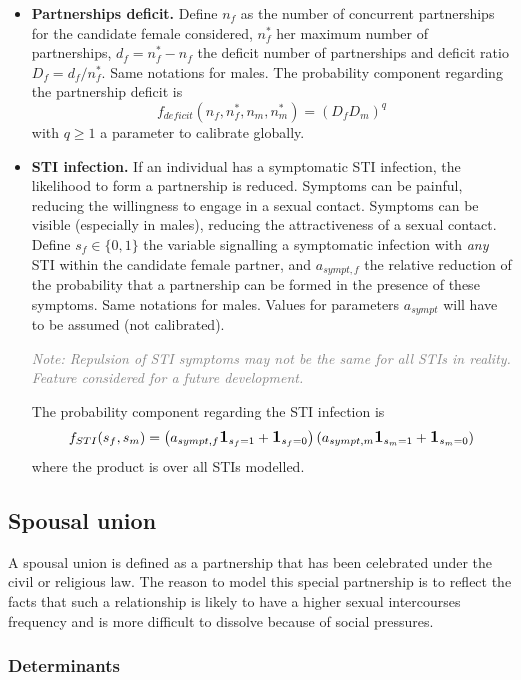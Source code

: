 \documentclass[11pt, onecolumn]{article}
\newcommand{\one}[1]{\textbf{\large{1}}_{#1}}
\newcommand{\note}[1]{\textit{\textcolor{Grey}{Note: #1}}}
\begin{document}
\begin{itemize}
\item \textbf{Partnerships deficit.} Define $n_f$ as the number of concurrent partnerships for the candidate female considered, $n^*_f$ her maximum number of partnerships, $d_f=n^*_f-n_f$ the deficit number of partnerships and deficit ratio $D_f=d_f/n^*_f$. Same notations for males. The probability component regarding the partnership deficit is
$$ f_{deficit}(n_f,n^*_f,n_m,n^*_m) = (D_f D_m)^q$$
with $q\geq 1$ a parameter to calibrate globally.

\item \textbf{STI infection.} If an individual has a symptomatic STI infection, the likelihood to form a partnership is reduced. Symptoms can be painful, reducing the willingness to engage in a sexual contact. Symptoms can be visible (especially in males), reducing the attractiveness of a sexual contact. Define $s_f\in\{0,1\}$ the variable signalling a symptomatic infection with \emph{any} STI within the candidate female partner, and $a_{sympt,f}$ the relative reduction of the probability that a partnership can be formed in the presence of these symptoms. Same notations for males. Values for parameters $a_{sympt}$ will have to be assumed (not calibrated). 

\note{Repulsion of STI symptoms may not be the same for all STIs in reality. Feature considered for a future development.}

The probability component regarding the STI infection is
$$ f_{STI}(s_f,s_m)= \left(a_{sympt,f} \one{s_f=1} +\one{s_f=0}\right) \left(a_{sympt,m} \one{s_m=1} +\one{s_m=0}\right)$$
where the product is over all STIs modelled.

\end{itemize}




\subsection{Spousal union}

A spousal union is defined as a partnership that has been celebrated under the civil or religious law. The reason to model this special partnership is to reflect the facts that such a relationship is likely to have a higher sexual intercourses frequency and is more difficult to dissolve because of social pressures.

\subsubsection{Determinants}
\end{document}
